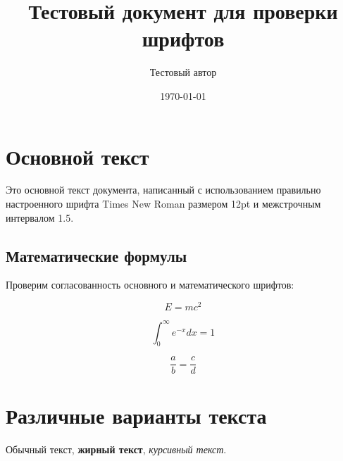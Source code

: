 \documentclass[12pt,a4paper]{article}
\title{Тестовый документ для проверки шрифтов}
\author{Тестовый автор}
\date{\today}
\begin{document}
\maketitle

\section{Основной текст}

Это основной текст документа, написанный с использованием правильно настроенного шрифта Times New Roman размером 12pt и межстрочным интервалом 1.5.

\subsection{Математические формулы}

Проверим согласованность основного и математического шрифтов:

$$E = mc^2$$

$$\int_{0}^{\infty} e^{-x} dx = 1$$

$$\frac{a}{b} = \frac{c}{d}$$

\section{Различные варианты текста}

Обычный текст, \textbf{жирный текст}, \textit{курсивный текст}.
\end{document}
